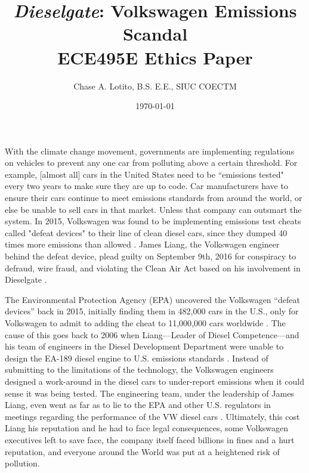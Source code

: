 \documentclass{article}
\title{\textbf{\textit{Dieselgate}: Volkswagen Emissions Scandal} \\ {\large ECE495E Ethics Paper}}
\author{Chase A. Lotito, B.S. E.E., SIUC COECTM}
\date{\today}
\begin{document}
\maketitle


With the climate change movement, governments are implementing regulations on vehicles to prevent any one car from polluting above a certain threshold. For example, [almost all] cars in the United States need to be ``emissions tested" every two years to make sure they are up to code. Car manufacturers have to ensure their cars continue to meet emissions standards from around the world, or else be unable to sell cars in that market. Unless that company can outsmart the system. In 2015, Volkswagen was found to be implementing emissions test cheats called "defeat devices" to their line of clean diesel cars, since they dumped 40 times more emissions than allowed \cite{engineer-pleads-guilty}. James Liang, the Volkswagen engineer behind the defeat device, plead guilty on September 9th, 2016 for conspiracy to defraud, wire fraud, and violating the Clean Air Act based on his involvement in Dieselgate \cite{engineer-pleads-guilty}. 


The Environmental Protection Agency (EPA) uncovered the Volkswagen ``defeat devices'' back in 2015, initially finding them in 482,000 cars in the U.S., only for Volkswagen to admit to adding the cheat to 11,000,000 cars worldwide \cite{bbc-russell}. The cause of this goes back to 2006 when Liang---Leader of Diesel Competence---and his team of engineers in the Diesel Development Department were unable to design the EA-189 diesel engine to U.S. emissions standards \cite{engineer-pleads-guilty}. Instead of submitting to the limitations of the technology, the Volkswagen engineers designed a work-around in the diesel cars to under-report emissions when it could sense it was being tested. The engineering team, under the leadership of James Liang, even went as far as to lie to the EPA and other U.S. regulators in meetings regarding the performance of the VW diesel cars \cite{engineer-pleads-guilty}. Ultimately, this cost Liang his reputation and he had to face legal consequences, some Volkswagen executives left to save face, the company itself faced billions in fines and a hurt reputation, and everyone around the World was put at a heightened risk of pollution. 
\end{document}
